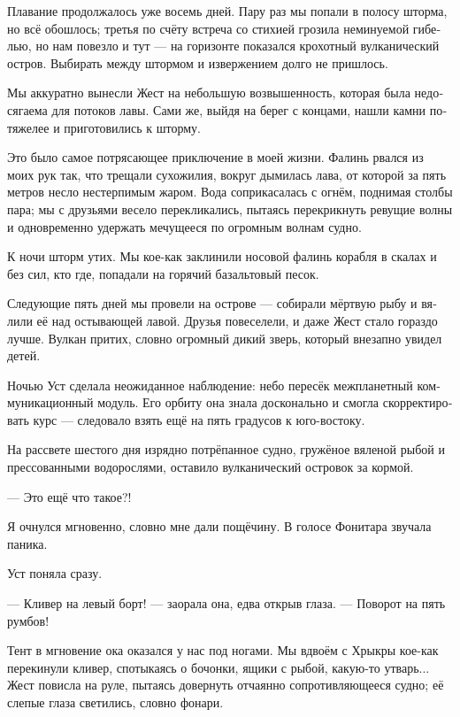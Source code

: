 \documentclass[a4paper,12pt,fleqn]{book}\usepackage{polyglossia}\setdefaultlanguage[babelshorthands=true]{russian}\setotherlanguage{english}\defaultfontfeatures{Ligatures=TeX,Mapping=tex-text}
\newcommand{\asterism}{\vspace{1em}{\centering\Large\bfseries$\ast~\ast~\ast$\par}\vspace{1em}}
\begin{document}
\asterism

Плавание продолжалось уже восемь дней.
Пару раз мы попали в полосу шторма, но всё обошлось;
третья по счёту встреча со стихией грозила неминуемой гибелью, но нам повезло и тут --- на горизонте показался крохотный вулканический остров.
Выбирать между штормом и извержением долго не пришлось.

Мы аккуратно вынесли Жест на небольшую возвышенность, которая была недосягаема для потоков лавы.
Сами же, выйдя на берег с концами, нашли камни потяжелее и приготовились к шторму.

Это было самое потрясающее приключение в моей жизни.
Фалинь рвался из моих рук так, что трещали сухожилия, вокруг дымилась лава, от которой за пять метров несло нестерпимым жаром.
Вода соприкасалась с огнём, поднимая столбы пара;
мы с друзьями весело перекликались, пытаясь перекрикнуть ревущие волны и одновременно удержать мечущееся по огромным волнам судно.

К ночи шторм утих.
Мы кое-как заклинили носовой фалинь корабля в скалах и без сил, кто где, попадали на горячий базальтовый песок.

Следующие пять дней мы провели на острове --- собирали мёртвую рыбу и вялили её над остывающей лавой.
Друзья повеселели, и даже Жест стало гораздо лучше.
Вулкан притих, словно огромный дикий зверь, который внезапно увидел детей.

Ночью Уст сделала неожиданное наблюдение: небо пересёк межпланетный коммуникационный модуль.
Его орбиту она знала досконально и смогла скорректировать курс --- следовало взять ещё на пять градусов к юго-востоку.

На рассвете шестого дня изрядно потрёпанное судно, гружёное вяленой рыбой и прессованными водорослями, оставило вулканический островок за кормой.

\asterism

--- Это ещё что такое?!

Я очнулся мгновенно, словно мне дали пощёчину.
В голосе Фонитара звучала паника.

Уст поняла сразу.

--- Кливер на левый борт! --- заорала она, едва открыв глаза.
--- Поворот на пять румбов!

Тент в мгновение ока оказался у нас под ногами.
Мы вдвоём с Хрыкры кое-как перекинули кливер, спотыкаясь о бочонки, ящики с рыбой, какую-то утварь...
Жест повисла на руле, пытаясь довернуть отчаянно сопротивляющееся судно;
её слепые глаза светились, словно фонари.
\end{document}
